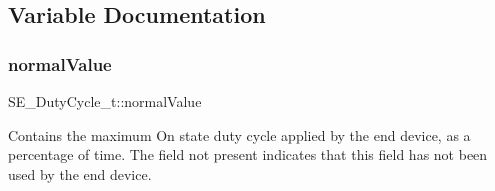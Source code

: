 \subsection{Variable Documentation}
\mbox{\label{group__DutyCycle_ga11141a0c1bf2a7bdbf3d85b845792070}} 
\subsubsection{\texorpdfstring{normal\+Value}{normalValue}}
{\footnotesize\ttfamily S\+E\+\_\+\+Duty\+Cycle\+\_\+t\+::normal\+Value}

Contains the maximum On state duty cycle applied by the end device, as a percentage of time. The field not present indicates that this field has not been used by the end device. 